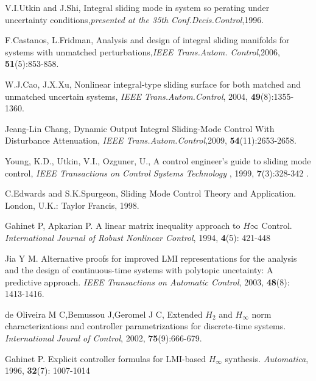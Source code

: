 \documentclass[journal,onecolumn]{IEEEtran}
\begin{document}
\begin{thebibliography}{99}
V.I.Utkin and J.Shi, Integral sliding mode in system so perating
under uncertainty conditions,{\sl presented at the 35th
Conf.Decis.Control},1996.



F.Castanos, L.Fridman, Analysis and design of integral sliding
manifolds for systems with unmatched perturbations,{\sl IEEE
Trans.Autom. Control},2006, {\bf 51}(5):853-858.

W.J.Cao, J.X.Xu, Nonlinear integral-type sliding surface for both
matched and unmatched uncertain systems, {\sl IEEE
Trans.Autom.Control}, 2004, {\bf 49}(8):1355-1360.

Jeang-Lin Chang, Dynamic Output Integral Sliding-Mode Control With
Disturbance Attenuation, {\sl IEEE Trans.Autom.Control},2009, {\bf
54}(11):2653-2658.

Young, K.D., Utkin, V.I., Ozguner, U., A control engineer's guide to
sliding mode control,  {\sl IEEE Transactions on Control Systems
Technology }, 1999, {\bf 7}(3):328-342 .

C.Edwards and S.K.Spurgeon, Sliding Mode Control Theory and
Application. London, U.K.: Taylor  Francis, 1998.


Gahinet P,   Apkarian P.  A linear matrix inequality  approach to
$H{\infty}$ Control. {\sl International  Journal of  Robust
Nonlinear Control}, 1994, {\bf 4}(5): 421-448




 Jia Y M. Alternative  proofs for improved  LMI  representations
for the analysis and  the  design  of continuous-time systems with
polytopic uncetainty: A predictive approach. {\sl IEEE Transactions
on Automatic Control}, 2003, {\bf 48}(8): 1413-1416.


de Oliveira M C,Bemussou J,Geromel J C, Extended $H_2$ and $H_{\infty}$
norm characterizations and controller parametrizations for
discrete-time systems. {\sl International Joural of Control}, 2002,
{\bf 75}(9):666-679.



Gahinet P.  Explicit controller formulas for LMI-based $H_{\infty}$
synthesis. {\sl Automatica}, 1996, {\bf 32}(7):  1007-1014




\end{thebibliography}
\end{document}
